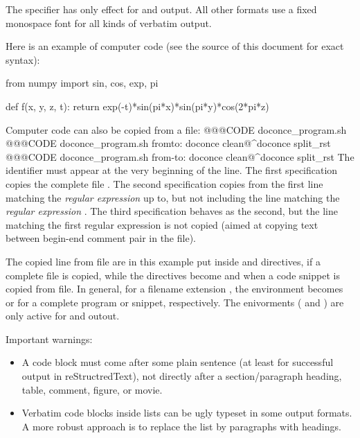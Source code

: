 \documentclass[%
oneside,                 %
final,                   %
10pt]{article}
\begin{document}
The  specifier has only effect for  and
 output. All other formats use a fixed monospace font for all
kinds of verbatim output.

Here is an example of computer code (see the source of this document
for exact syntax):

\bcod
from numpy import sin, cos, exp, pi

def f(x, y, z, t):
    return exp(-t)*sin(pi*x)*sin(pi*y)*cos(2*pi*z)
\ecod

Computer code can also be copied from a file:
\bccq
 @@@CODE doconce_program.sh
 @@@CODE doconce_program.sh  fromto: doconce clean@^doconce split_rst
 @@@CODE doconce_program.sh  from-to: doconce clean@^doconce split_rst
\eccq
The  identifier must appear at the very beginning of the line.
The first specification copies the complete file .
The second specification copies from the first line matching the \emph{regular
expression}  up to, but not including the line
matching the \emph{regular expression} .
The third specification behaves as the second, but the line matching
the first regular expression is not copied (aimed at copying
text between begin-end comment pair in the file).

The copied line from file are in this example put inside 
and  directives, if a complete file is copied, while the
directives become  and  when a code snippet is copied
from file. In general, for a filename extension , the environment
becomes  or  for a complete program or snippet,
respectively. The enivorments ( and ) are only active
for  and  outout.

Important warnings:

\begin{itemize}
 \item A code block must come after some plain sentence (at least for successful
   output in reStructredText), not directly after a section/paragraph heading,
   table, comment, figure, or movie.

 \item Verbatim code blocks inside lists can be ugly typeset in some
   output formats. A more robust approach is to replace the list by
   paragraphs with headings.
\end{itemize}
\end{document}
